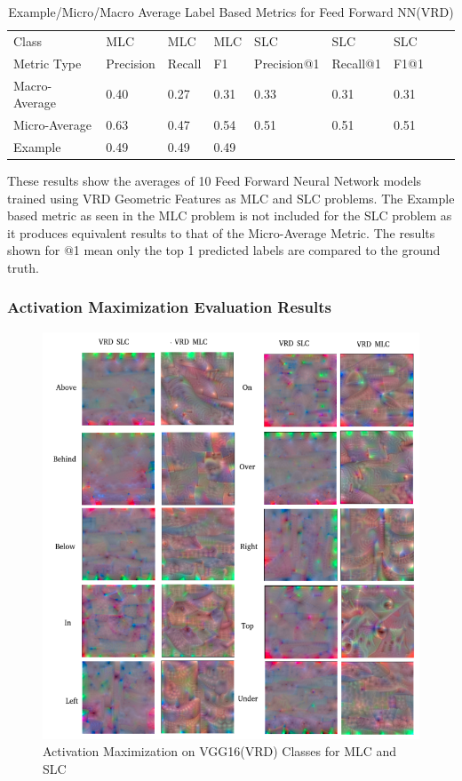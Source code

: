\documentclass{csfyp}
\begin{document}
\begin{table}[!htbp]
\begin{tabular}{|l|l|l|l|l|l|l|l|l}
\cline{1-7}
Class &  MLC  &  MLC  &  MLC & SLC &  SLC & SLC \\ \cline{1-7}
Metric Type  & Precision &  Recall & F1 & Precision@1 & Recall@1 & F1@1 \\ \cline{1-7}
Macro-Average &	0.40	&	0.27	&	0.31	&	0.33	&	0.31	&	0.31 \\ \cline{1-7}
Micro-Average &	0.63	&	0.47	&	0.54	&	0.51	&	0.51	&	0.51 \\ \cline{1-7}
Example       &	0.49	&	0.49	&	0.49 \\ \cline{1-4}
\end{tabular}
\caption{Example/Micro/Macro Average Label Based Metrics for Feed Forward NN(VRD)}
These results show the averages of 10 Feed Forward Neural Network models trained using VRD Geometric Features as MLC and SLC problems. The Example based metric as seen in the MLC problem is not included for the SLC problem as it produces equivalent results to that of the Micro-Average Metric. The results shown for @1 mean only the top 1 predicted labels are compared to the ground truth.
\vspace{-4mm}
\end{table}

\subsubsection{Activation Maximization Evaluation Results}

\begin{figure}[!htbp]
	\includegraphics[scale=0.60,center]{VRD_act.pdf}
	\caption{Activation Maximization on VGG16(VRD) Classes for MLC and SLC}
\end{figure}
\end{document}
